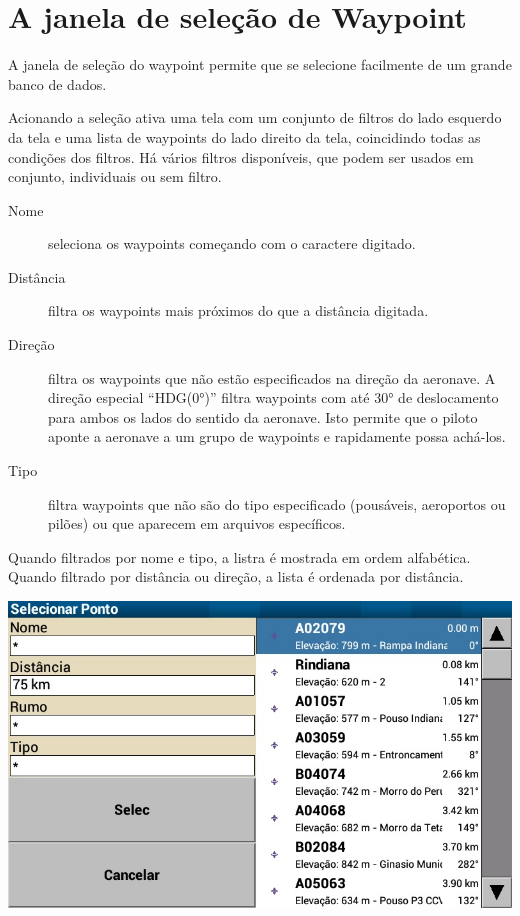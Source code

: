 \section{A janela de seleção de Waypoint}\label{sec:waypoint-selector-dialog}

A janela de seleção do waypoint permite que se selecione facilmente de um grande banco de dados.  

Acionando a seleção ativa uma tela com um conjunto de filtros do lado 
esquerdo da tela e uma lista de waypoints do lado direito da tela, coincidindo todas as condições dos filtros.  Há vários filtros disponíveis, que podem ser usados em conjunto, individuais ou sem filtro.
\begin{description}
\item[Nome] seleciona os waypoints começando com o caractere digitado.
\item[Distância] filtra os waypoints mais próximos do que a distância digitada.
\item[Direção] filtra os waypoints que não estão especificados na direção da aeronave.  A direção especial “HDG(0°)” filtra waypoints com até 30° de deslocamento para ambos os lados do sentido da aeronave.  Isto permite que o piloto aponte a aeronave a um grupo de waypoints e rapidamente possa achá-los.
\item[Tipo] filtra waypoints que não são do tipo especificado (pousáveis, aeroportos ou pilões) ou que aparecem em arquivos específicos.
\end{description}
Quando filtrados por nome e tipo, a listra é mostrada em ordem alfabética.  Quando filtrado por distância ou direção, a lista é ordenada por distância.  

\begin{center}
\includegraphics[angle=0,width=0.8\linewidth,keepaspectratio='true']{figures/dialog-waypointselect.png}
\end{center}

